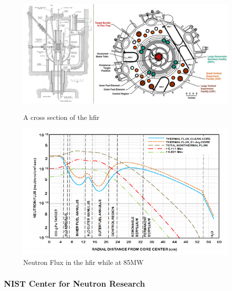 \begin{figure}[tbp]
  \begin{minipage}[b]{0.49\linewidth}
  \begin{center}
    \includegraphics[width=.98\linewidth]{chapters/isotope_activation_and_radioactive_decay/images/hfir-cross-sections.jpg}
    \caption{A cross section of the \acrshort{hfir} \cite{hfirornl}}
    \label{fig:hfirxs}
  \end{center}
  \end{minipage}
  \begin{minipage}[b]{0.49\linewidth}
  \begin{center}
    \includegraphics[width=.98\linewidth]{chapters/isotope_activation_and_radioactive_decay/images/hfirneutronflux.png}
    \caption{Neutron Flux in the \acrshort{hfir} while at 85MW \cite{hfiruserguide}}
    \label{fig:hfirflux}
  \end{center}
  \end{minipage}
\end{figure}



\FloatBarrier
\subsubsection{NIST Center for Neutron Research}

